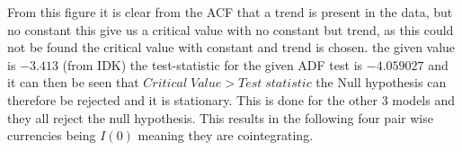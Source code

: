 \noindent From this figure it is clear from the ACF that a trend is present in the data, but no constant this give us a critical value with no constant but trend, as this could not be found the critical value with constant and trend is chosen. the given value is $-3.413$ (from IDK) the test-statistic for the given ADF test is $-4.059027$ and it can then be seen that $Critical\; Value>Test\;statistic$ the Null hypothesis can therefore be rejected and it is stationary. This is done for the other 3 models and they all reject the null hypothesis. This results in the following four pair wise currencies being $I(0)$ meaning they are cointegrating. 













